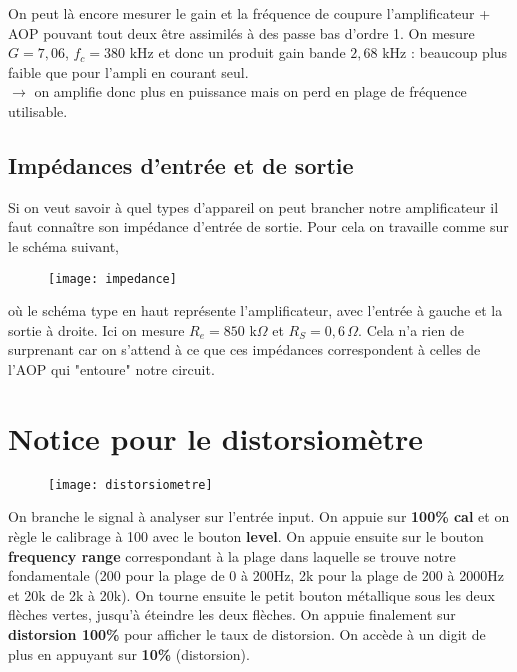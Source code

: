 \documentclass[12pt,prb,aps,epsf]{article}
\begin{document}
On peut là encore mesurer le gain et la fréquence de coupure l'amplificateur + AOP pouvant tout deux être assimilés à des passe bas d'ordre 1. On mesure $G = 7,06$, $f_c = 380$ kHz et donc un produit gain bande $2,68$ kHz : beaucoup plus faible que pour l'ampli en courant seul.\\
$\longrightarrow$ on amplifie donc plus en puissance mais on perd en plage de fréquence utilisable.


\subsection*{Impédances d'entrée et de sortie}
Si on veut savoir à quel types d'appareil on peut brancher notre amplificateur il faut connaître son impédance d'entrée de sortie. Pour cela on travaille comme sur le schéma suivant,
\begin{figure}[h]
	\centering \texttt{[image: impedance]}
\end{figure}
où le schéma type en haut représente l'amplificateur, avec l'entrée à gauche et la sortie à droite. Ici on mesure $R_e= 850$ k$\Omega$ et $R_S = 0,6\,\Omega$. Cela n'a rien de surprenant car on s'attend à ce que ces impédances correspondent à celles de l'AOP qui "entoure" notre circuit.

\section{Notice pour le distorsiomètre}
\begin{figure}[h]
	\centering \texttt{[image: distorsiometre]}
\end{figure}
On branche le signal à analyser sur l'entrée input. On appuie sur \textbf{100\% cal} et on règle le calibrage à 100 avec le bouton \textbf{level}. On appuie ensuite sur le bouton \textbf{frequency range} correspondant à la plage dans laquelle se trouve notre fondamentale (200 pour la plage de 0 à 200Hz, 2k pour la plage de 200 à 2000Hz et 20k de 2k à 20k). On tourne ensuite le petit bouton métallique sous les deux flèches vertes, jusqu'à éteindre les deux flèches. On appuie finalement sur \textbf{distorsion 100\%} pour afficher le taux de distorsion. On accède à un digit de plus en appuyant sur \textbf{10\%} (distorsion). 

 
\end{document}
